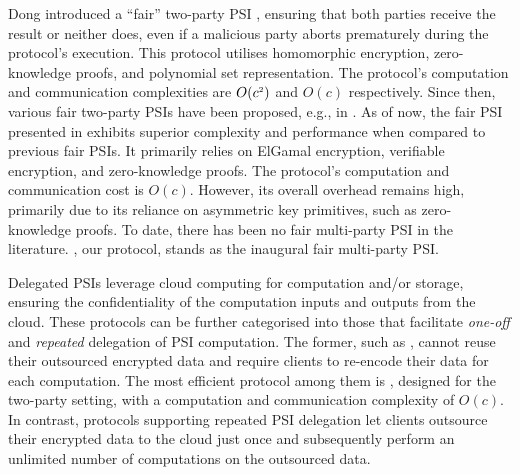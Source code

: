Dong \et introduced a ``fair'' two-party PSI \cite{DBLP:conf/dbsec/DongCCR13},  ensuring that both parties receive the result or neither does, even if a malicious party aborts prematurely during the protocol's execution. This protocol utilises homomorphic encryption, zero-knowledge proofs, and polynomial set representation. The protocol's  computation and communication complexities are $O(c^{\scriptscriptstyle 2})$ and $O(c)$  respectively. Since then, various fair two-party PSIs have been proposed, e.g.,  in \cite{DebnathD14,DebnathD16-,DebnathD16}. As of now, the fair PSI presented in \cite{DebnathD16} exhibits superior complexity and performance when compared to previous fair PSIs. It primarily relies on ElGamal encryption, verifiable encryption, and zero-knowledge proofs. The protocol's computation and communication cost is $O(c)$. However, its overall overhead remains high, primarily due to its reliance on asymmetric key primitives, such as zero-knowledge proofs. To date, there has been no fair multi-party PSI in the literature. \withFai, our protocol, stands as the inaugural fair multi-party PSI.





Delegated PSIs leverage cloud computing for computation and/or storage, ensuring the confidentiality of the computation inputs and outputs from the cloud. These protocols can be further categorised into those that facilitate \textit{one-off} and \textit{repeated} delegation of PSI computation. The former, such as \cite{kamarascaling,kerschbaum12,c18}, cannot reuse their outsourced encrypted data and require clients to re-encode their data for each computation. The most efficient protocol among them is \cite{kamarascaling}, designed for the two-party setting, with a computation and communication complexity of $O(c)$.  In contrast, protocols supporting repeated PSI delegation let clients outsource their encrypted data to the cloud just once and subsequently perform an unlimited number of computations on the outsourced data.
 
